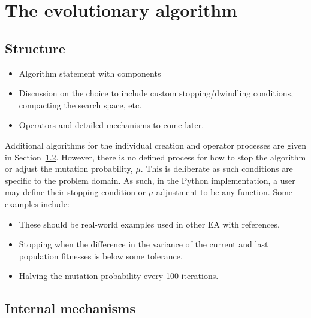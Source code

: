 \section{The evolutionary algorithm}\label{section:algorithm}

\subsection{Structure}

\begin{itemize}
    \item Algorithm statement with components
    \item Discussion on the choice to include custom stopping/dwindling
        conditions, compacting the search space, etc.
    \item Operators and detailed mechanisms to come later.
\end{itemize}












Additional algorithms for the individual creation and operator processes are
given in Section~\ref{subsection:mechanisms}. However, there is no defined
process for how to stop the algorithm or adjust the mutation probability,
\(\mu\). This is deliberate as such conditions are specific to the problem
domain. As such, in the Python implementation, a user may define their stopping
condition or \(\mu\)-adjustment to be any function. Some examples include:

\begin{itemize}
    \item These should be real-world examples used in other EA with references.
    \item Stopping when the difference in the variance of the current and last
        population fitnesses is below some tolerance.
    \item Halving the mutation probability every 100 iterations.
\end{itemize}
        

\subsection{Internal mechanisms}\label{subsection:mechanisms}

